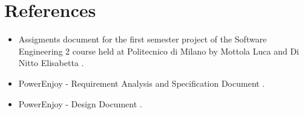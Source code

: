 \section{References}

\begin{itemize}
	\item Assigments document for the first semester project of the Software Engineering 2 course held at Politecnico di Milano by Mottola Luca and Di Nitto Elisabetta \cite{assignments}.
	\item PowerEnjoy - Requirement Analysis and Specification Document \cite{rasd}.
	\item PowerEnjoy - Design Document \cite{dd}.
\end{itemize}
